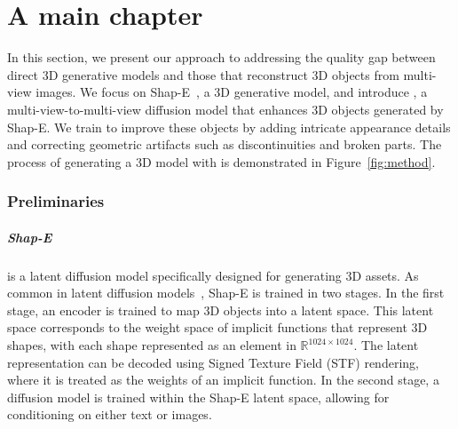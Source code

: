 \chapter{A main chapter}
\label{chap:firstchap}

In this section, we present our approach to addressing the quality gap between direct 3D generative models and those that reconstruct 3D objects from multi-view images.
We focus on Shap-E~\cite{jun2023shape}, a 3D generative model, and introduce \emph{\ourname}, a multi-view-to-multi-view diffusion model that enhances 3D objects generated by Shap-E. We train \ourname{} to improve these objects by adding intricate appearance details and correcting geometric artifacts such as discontinuities and broken parts.
The process of generating a 3D model with \ourname{} is demonstrated in Figure~\ref{fig:method}.

\vspace{-2pt}
\subsection{Preliminaries}
\vspace{-2pt}

\paragraph{Shap-E} 
is a latent diffusion model specifically designed for generating 3D assets. As common in latent diffusion models~\cite{rombach2022highresolutionimagesynthesislatent}, Shap-E is trained in two stages. In the first stage, an encoder is trained to map 3D objects into a latent space. This latent space corresponds to the weight space of implicit functions that represent 3D shapes, with each shape represented as an element in $\mathbb{R}^{1024\times1024}$. The latent representation can be decoded using Signed Texture Field (STF) rendering, where it is treated as the weights of an implicit function.
In the second stage, a diffusion model is trained within the Shap-E latent space, allowing for conditioning on either text or images.

\vspace{-14pt}
